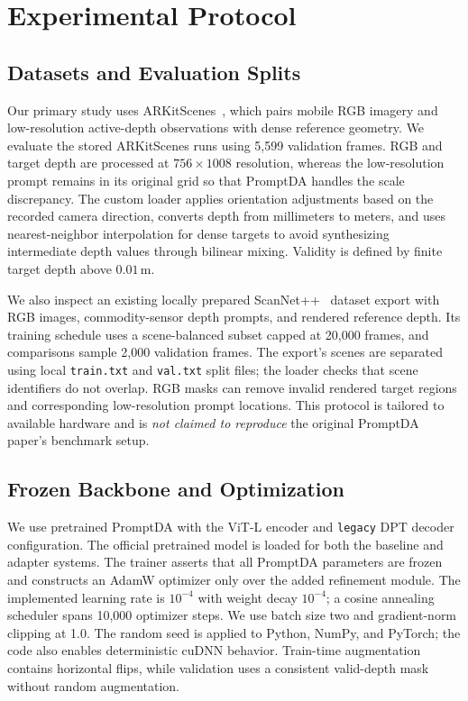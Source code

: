\section{Experimental Protocol}
\label{sec:experiments}
\subsection{Datasets and Evaluation Splits}
Our primary study uses ARKitScenes~\cite{baruch2021arkitscenes}, which pairs mobile RGB imagery and low-resolution active-depth observations with dense reference geometry. We evaluate the stored ARKitScenes runs using 5,599 validation frames. RGB and target depth are processed at $756\times1008$ resolution, whereas the low-resolution prompt remains in its original grid so that PromptDA handles the scale discrepancy. The custom loader applies orientation adjustments based on the recorded camera direction, converts depth from millimeters to meters, and uses nearest-neighbor interpolation for dense targets to avoid synthesizing intermediate depth values through bilinear mixing. Validity is defined by finite target depth above $0.01$\,m.

We also inspect an existing locally prepared ScanNet++~\cite{yeshwanth2023scannetpp} dataset export with RGB images, commodity-sensor depth prompts, and rendered reference depth. Its training schedule uses a scene-balanced subset capped at 20,000 frames, and comparisons sample 2,000 validation frames. The export's scenes are separated using local \texttt{train.txt} and \texttt{val.txt} split files; the loader checks that scene identifiers do not overlap. RGB masks can remove invalid rendered target regions and corresponding low-resolution prompt locations. This protocol is tailored to available hardware and is \emph{not claimed to reproduce} the original PromptDA paper's benchmark setup.

\subsection{Frozen Backbone and Optimization}
We use pretrained PromptDA with the ViT-L encoder and \texttt{legacy} DPT decoder configuration. The official pretrained model is loaded for both the baseline and adapter systems. The trainer asserts that all PromptDA parameters are frozen and constructs an AdamW optimizer only over the added refinement module. The implemented learning rate is $10^{-4}$ with weight decay $10^{-4}$; a cosine annealing scheduler spans 10,000 optimizer steps. We use batch size two and gradient-norm clipping at 1.0. The random seed is applied to Python, NumPy, and PyTorch; the code also enables deterministic cuDNN behavior. Train-time augmentation contains horizontal flips, while validation uses a consistent valid-depth mask without random augmentation.

